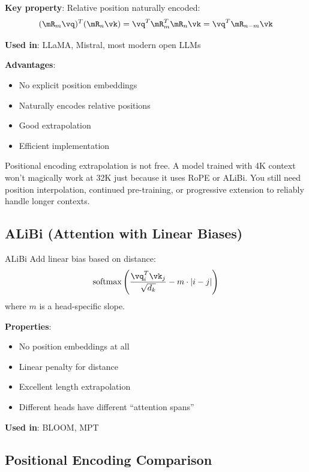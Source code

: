 \textbf{Key property}: Relative position naturally encoded:
\begin{equation}
(\mR_m \vq)^T (\mR_n \vk) = \vq^T \mR_m^T \mR_n \vk = \vq^T \mR_{n-m} \vk
\end{equation}

\textbf{Used in}: LLaMA, Mistral, most modern open LLMs

\textbf{Advantages}:
\begin{itemize}
    \item No explicit position embeddings
    \item Naturally encodes relative positions
    \item Good extrapolation
    \item Efficient implementation
\end{itemize}

\begin{warningbox}
Positional encoding extrapolation is not free. A model trained with 4K context won't magically work at 32K just because it uses RoPE or ALiBi. You still need position interpolation, continued pre-training, or progressive extension to reliably handle longer contexts.
\end{warningbox}

\subsection{ALiBi (Attention with Linear Biases)}

\begin{mathresult}{ALiBi}
Add linear bias based on distance:
\begin{equation}
\text{softmax}\left(\frac{\vq_i^T \vk_j}{\sqrt{d_k}} - m \cdot |i - j|\right)
\end{equation}
where $m$ is a head-specific slope.
\end{mathresult}

\textbf{Properties}:
\begin{itemize}
    \item No position embeddings at all
    \item Linear penalty for distance
    \item Excellent length extrapolation
    \item Different heads have different ``attention spans''
\end{itemize}

\textbf{Used in}: BLOOM, MPT

\subsection{Positional Encoding Comparison}


